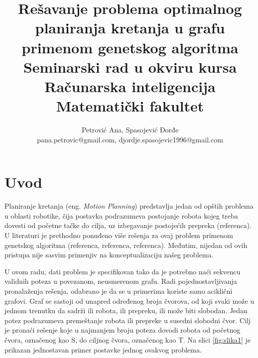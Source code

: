 \documentclass[12pt]{article}
\begin{document}
	
	\title{Rešavanje problema optimalnog planiranja kretanja u grafu primenom genetskog algoritma \\ \large{Seminarski rad u okviru kursa Računarska inteligencija Matematički fakultet}}

	\author{Petrović Ana, Spasojević Đorđe\\pana.petrovic@gmail.com, djordje.spasojevic1996@gmail.com}
	
	
	\maketitle
	\thispagestyle{empty}
	\vspace*{2\baselineskip}
\newpage
	\tableofcontents
	
	\newpage
	
	\section{Uvod}
	\label{sec:uvod}  
	\par Planiranje kretanja (eng. \textit{Motion Planning}) predstavlja jedan od opštih problema u oblasti robotike, čija postavka podrazumeva postojanje robota kojeg treba dovesti od početne tačke do cilja, uz izbegavanje postojećih prepreka (referenca). U literaturi je prethodno ponuđeno više rešenja za ovaj problem primenom genetskog algoritma (referenca, referenca, referenca). Međutim, nijedan od ovih pristupa nije sasvim primenjiv na konceptualizaciju našeg problema.
	\par U ovom radu, dati problem je specifikovan tako da je  potrebno naći sekvencu validnih poteza u povezanom, neusmerenom grafu. Radi pojednostavljivanja pronalaženja rešenja, odabrano je da se u primerima koriste samo aciklični grafovi. Graf se sastoji od unapred određenog broja čvorova, od koji svaki može u jednom trenutku da sadrži ili robota, ili prepreku, ili može biti  slobodan. Jedan potez podrazumeva premeštanje robota ili prepreke u susedni slobodni čvor. Cilj je pronaći rešenje koje u najmanjem broju poteza dovodi robota od početnog čvora, označenog kao S, do ciljnog čvora, označenog kao T. 
	Na slici \ref{fig:slika1} je prikazan jednostavan primer postavke jednog ovakvog problema.
	
\end{document}
